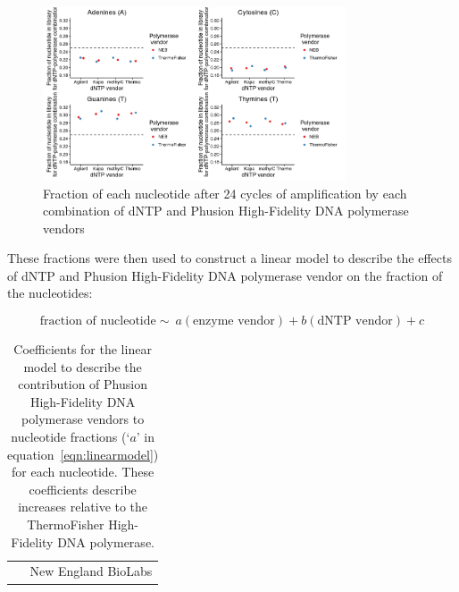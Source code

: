 \documentclass[a4paper, numbers=noenddot]{scrbook}
\begin{document}
\begin{figure}[htbp]
  \centering
  \includegraphics[width=0.8\textwidth]{linearmodel_acgt}
  \caption{Fraction of each nucleotide after 24 cycles of amplification by each combination of dNTP and Phusion High-Fidelity DNA polymerase vendors}
  \label{fig:linearmodel_nt}
\end{figure}

These fractions were then used to construct a linear model to describe the effects of dNTP and Phusion High-Fidelity DNA polymerase vendor on the fraction of the nucleotides:  %

\begin{equation}
  \label{eqn:linearmodel}
  \textrm{fraction of nucleotide} \sim\ a (\textrm{enzyme vendor}) + b (\textrm{dNTP vendor}) + c
\end{equation}

\begin{table}[h]
  \centering
  \begin{tabular}{r}
    \toprule
    \\
    \midrule
    New England BioLabs\\
    \bottomrule
  \end{tabular}%
  \caption{Coefficients for the linear model to describe the contribution of Phusion High-Fidelity DNA polymerase vendors to nucleotide fractions (`$a$' in equation~\ref{eqn:linearmodel}) for each nucleotide.  These coefficients describe increases relative to the ThermoFisher High-Fidelity DNA polymerase.}
  \label{tab:linearmodel_coeffs_a}
\end{table}
\end{document}
